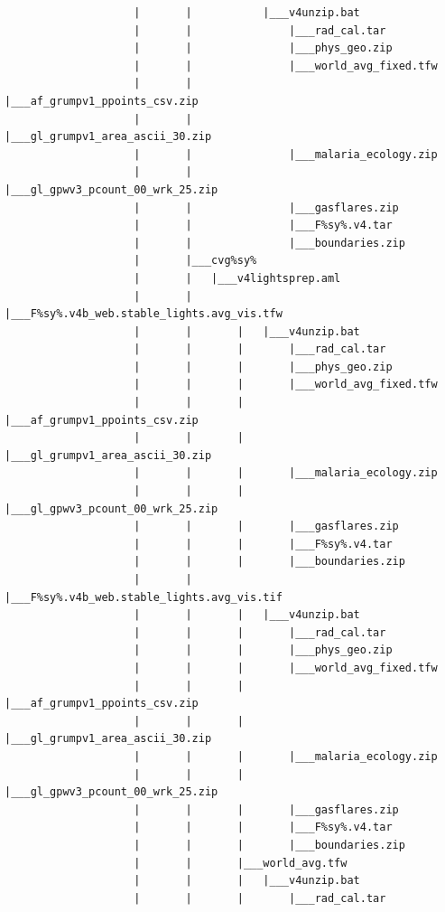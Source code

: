 \documentclass[]{book}
\begin{document}
\begin{verbatim}
                    |       |           |___v4unzip.bat
                    |       |               |___rad_cal.tar
                    |       |               |___phys_geo.zip
                    |       |               |___world_avg_fixed.tfw
                    |       |               |___af_grumpv1_ppoints_csv.zip
                    |       |               |___gl_grumpv1_area_ascii_30.zip
                    |       |               |___malaria_ecology.zip
                    |       |               |___gl_gpwv3_pcount_00_wrk_25.zip
                    |       |               |___gasflares.zip
                    |       |               |___F%sy%.v4.tar
                    |       |               |___boundaries.zip
                    |       |___cvg%sy%
                    |       |   |___v4lightsprep.aml
                    |       |       |___F%sy%.v4b_web.stable_lights.avg_vis.tfw
                    |       |       |   |___v4unzip.bat
                    |       |       |       |___rad_cal.tar
                    |       |       |       |___phys_geo.zip
                    |       |       |       |___world_avg_fixed.tfw
                    |       |       |       |___af_grumpv1_ppoints_csv.zip
                    |       |       |       |___gl_grumpv1_area_ascii_30.zip
                    |       |       |       |___malaria_ecology.zip
                    |       |       |       |___gl_gpwv3_pcount_00_wrk_25.zip
                    |       |       |       |___gasflares.zip
                    |       |       |       |___F%sy%.v4.tar
                    |       |       |       |___boundaries.zip
                    |       |       |___F%sy%.v4b_web.stable_lights.avg_vis.tif
                    |       |       |   |___v4unzip.bat
                    |       |       |       |___rad_cal.tar
                    |       |       |       |___phys_geo.zip
                    |       |       |       |___world_avg_fixed.tfw
                    |       |       |       |___af_grumpv1_ppoints_csv.zip
                    |       |       |       |___gl_grumpv1_area_ascii_30.zip
                    |       |       |       |___malaria_ecology.zip
                    |       |       |       |___gl_gpwv3_pcount_00_wrk_25.zip
                    |       |       |       |___gasflares.zip
                    |       |       |       |___F%sy%.v4.tar
                    |       |       |       |___boundaries.zip
                    |       |       |___world_avg.tfw
                    |       |       |   |___v4unzip.bat
                    |       |       |       |___rad_cal.tar

\end{verbatim}
\end{document}
